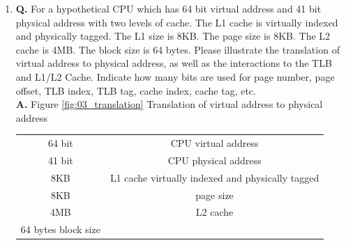 \documentclass[main.tex]{subfiles}
\begin{document}
\begin{enumerate}
\begin{enumerate}
    \item
    \begin{enumerate}
        \item $(0$ $01111011$ $10011001100110011001101)_2$ contains the sign bit $b_{31} = 0$, the decimal value of the exponent bits $b_{23}*2^0 + b_{24}*2^1 + \cdots + b_{30}*2^7 = 1*2^0 + 1*2^1 + \cdots + 0*2^7 = 123$, and the decimal value of the mantissa bits $b_{22}*2^{-1} + b_{21}*2^{-2} + \cdots + b_{0}*2^{-23} = 1*2^{-1} + 0*2^{-2} + \cdots + 1*2^{-23} = 0.6000015735626221$. Calculate the decimal value using 
        $(-1)^S \times (1+Fraction) \times 2^{(Exponent-bias)} = (-1)^0 \times (1+0.6000015735626221) \times 2^{(123-127)} = 1.6000015735626221 \times 0.0625 = 0.10000009834766388125$. Decimal 0.1 cannot be represented in single precision format exactly (or any precision format), only approximated up to the maximum number of bits available in the mantissa, because as we can see in table # ... a loop of repeating values forms when multiplying the decimal by 2.
        
        \item $(0$ $10011000$ $00000000000000000000000)_2$ contains the sign bit $b_{31} = 0$, the exponent bits $b_{23}*2^0 + b_{24}*2^1 + \cdots + b_{30}*2^7 = 0*2^0 + 0*2^1 + \cdots + 1*2^7 = 152$, andd the mantissa bits $b_{22}*2^{-1} + b_{21}*2^{-2} + \cdots + b_{0}*2^{-23} = 0*2^{-1} + 0*2^{-2} + \cdots + 0*2^{-23} = 0$. Calculate the decimal value using 
        $(-1)^S \times (1+Fraction) \times 2^{(Exponent-bias)} = (-1)^0 \times (1+0) \times 2^{(152-127)} = 33554432$.
    \end{enumerate}
\end{enumerate}

\item \textbf{Q.} For a hypothetical CPU which has 64 bit virtual address and 41 bit physical address with two levels of cache. The L1 cache is virtually indexed and physically tagged. The L1 size is 8KB. The page size is 8KB. The L2 cache is 4MB. The block size is 64 bytes. Please illustrate the translation of virtual address to physical address, as well as the interactions to the TLB and L1/L2 Cache. Indicate how many bits are used for page number, page offset, TLB index, TLB tag, cache index, cache tag, etc. \\

\textbf{A.} Figure \ref{fig:03_translation} Translation of virtual address to physical address

\begin{tabular}{ c c }
 64 bit & CPU virtual address\\ 
 41 bit & CPU physical address\\  
 8KB & L1 cache virtually indexed and physically tagged\\
 8KB & page size\\
 4MB & L2 cache\\
 64 bytes block size\\
\end{tabular}


\end{enumerate}
\end{document}
